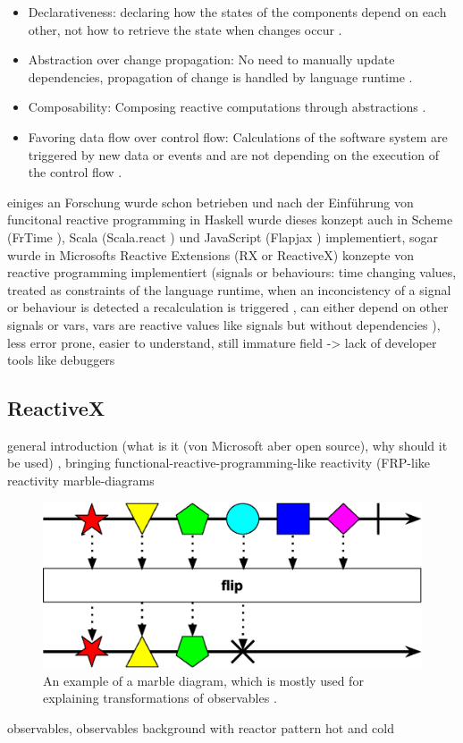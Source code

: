 \documentclass[Bachelor,BIF,english]{twbook}
\begin{document}
\begin{itemize}
\item Declarativeness: declaring how the states of the components depend on each other, not how to retrieve the state when changes occur \cite[p.~2]{PositivEffectOfRP}.
\item Abstraction over change propagation: No need to manually update dependencies, propagation of change is handled by language runtime \cite[p.~2]{PositivEffectOfRP}.
\item Composability: Composing reactive computations through abstractions \cite[p.~2]{PositivEffectOfRP}.
\item Favoring data flow over control flow: Calculations of the software system are triggered by new data or events and are not depending on the execution of the control flow \cite[p.~2]{PositivEffectOfRP}.
\end{itemize}
einiges an Forschung wurde schon betrieben und nach der Einführung von funcitonal reactive programming in Haskell wurde dieses konzept auch in Scheme (FrTime \cite{FrTime}), Scala (Scala.react \cite{DeprecatingOP}) und JavaScript (Flapjax \cite{Flapjax}) implementiert, sogar wurde in Microsofts Reactive Extensions (RX or ReactiveX) konzepte von reactive programming implementiert \cite[p.~954]{RPWalkthrough} \cite[p.~796]{DebuggingRP} \cite[p.~2]{PositivEffectOfRP}
(signals or behaviours: time changing values, treated as constraints of the language runtime, when an inconcistency of a signal or behaviour is detected a recalculation is triggered \cite[p.~797]{DebuggingRP} \cite[p.~3]{PositivEffectOfRP}, can either depend on other signals or vars, vars are reactive values like signals but without dependencies \cite[p.~2]{PositivEffectOfRP}), less error prone, easier to understand, still immature field -> lack of developer tools like debuggers \cite[p.~796]{DebuggingRP}

\subsection{ReactiveX}
general introduction (what is it \cite{ReactiveExtensions} \cite[p.~291]{RxAngular5Prj} (von Microsoft aber open source), why should it be used) \cite{ReactiveX}, bringing functional-reactive-programming-like reactivity (FRP-like reactivity \cite{PositivEffectOfRP}
marble-diagrams
\begin{figure}[!htbp]
\centering
\includegraphics[width=0.5\linewidth]{PICs/marble_diagram.eps}
\caption{An example of a marble diagram, which is mostly used for explaining transformations of observables \cite{RxObservables}.}\label{Fig2}
\end{figure}
observables, observables background with reactor pattern \cite{RxObservables} \cite[p.~292]{RxAngular5Prj} \cite[p.~310]{RxAngular5Prj}
hot and cold \cite{RxObservables}
\end{document}
